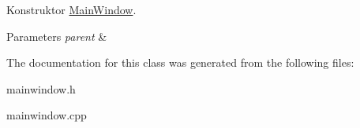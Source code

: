 Konstruktor \hyperlink{class_main_window}{Main\+Window}. 


\begin{DoxyParams}{Parameters}
{\em parent} & \\
\hline
\end{DoxyParams}


The documentation for this class was generated from the following files\+:\begin{DoxyCompactItemize}
\item 
mainwindow.\+h\item 
mainwindow.\+cpp\end{DoxyCompactItemize}
